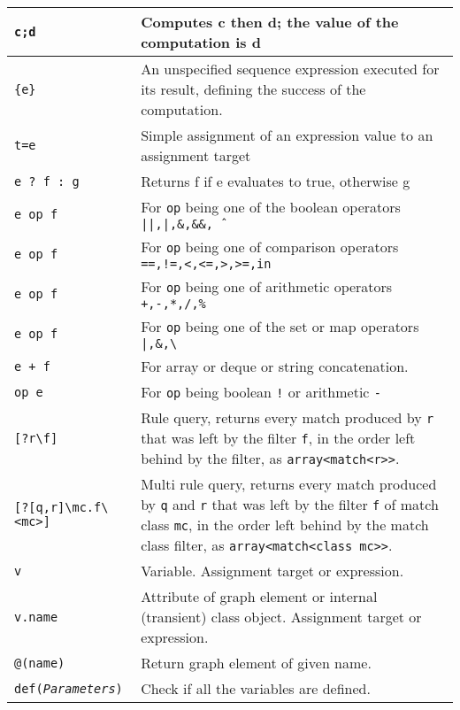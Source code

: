 \begin{table}[htbp]
\begin{minipage}{\linewidth} \renewcommand{\footnoterule}{} 
\begin{tabularx}{\linewidth}{|lX|}
\hline
\texttt{c;d} & Computes c then d; the value of the computation is d\\
\hline
\texttt{\{e\}} & An unspecified sequence expression executed for its result, defining the success of the computation.\\
\hline
\texttt{t=e} & Simple assignment of an expression value to an assignment target\\
\hline
\texttt{e ? f : g} & Returns f if e evaluates to true, otherwise g \\
\texttt{e op f} & For \texttt{op} being one of the boolean operators \texttt{||,|,\&,\&\&,\^\ } \\
\texttt{e op f} & For \texttt{op} being one of comparison operators \texttt{==,!=,<,<=,>,>=,in} \\
\texttt{e op f} & For \texttt{op} being one of arithmetic operators \texttt{+,-,*,/,\%} \\
\texttt{e op f} & For \texttt{op} being one of the set or map operators \texttt{|,\&,\textbackslash} \\
\texttt{e + f} & For array or deque or string concatenation. \\
\texttt{op e} & For \texttt{op} being boolean \texttt{!} or arithmetic \texttt{-}\\
\hline
\texttt{[?r\textbackslash f]} & Rule query, returns every match produced by \texttt{r} that was left by the filter \texttt{f}, in the order left behind by the filter, as \texttt{array<match<r>>}. \\
\texttt{[?[q,r]\textbackslash mc.f\textbackslash<mc>]} & Multi rule query, returns every match produced by \texttt{q} and \texttt{r} that was left by the filter \texttt{f} of match class \texttt{mc}, in the order left behind by the match class filter, as \texttt{array<match<class mc>>}. \\
\hline
\texttt{v} & Variable. Assignment target or expression.\\
\texttt{v.name} & Attribute of graph element or internal (transient) class object. Assignment target or expression.\\
\texttt{@(name)} & Return graph element of given name.\\
\texttt{def(\emph{Parameters})} & Check if all the variables are defined.\\

\end{tabularx}
\end{minipage}
\end{table}
